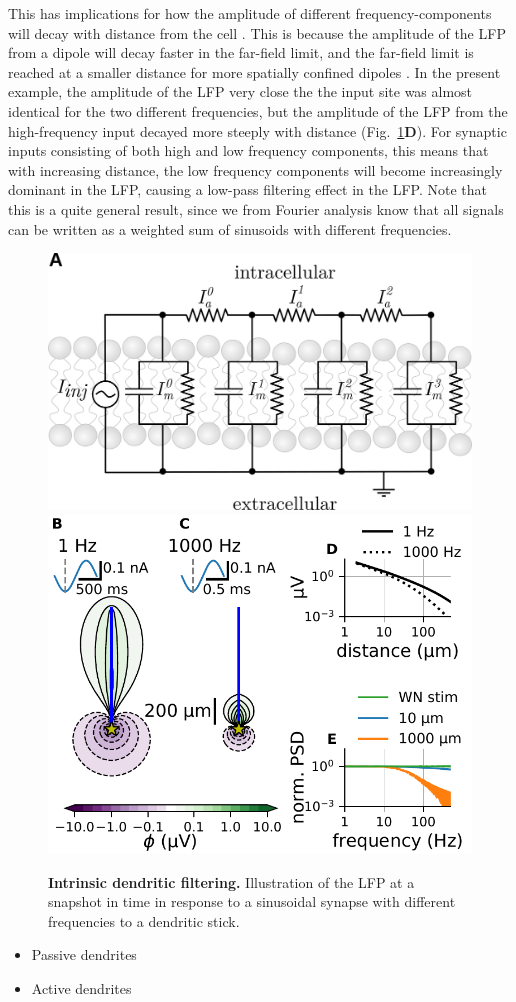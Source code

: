 This has implications for how the amplitude of different frequency-components will decay with distance from the cell \cite{Linden2010}. This is because the amplitude of the LFP from a dipole will decay faster in the far-field limit, and the far-field limit is reached at a smaller distance for more spatially confined dipoles \cite{Linden2010}. In the present example, the amplitude of the LFP very close the the input site was almost identical for the two different frequencies, but the amplitude of the LFP from the high-frequency input decayed more steeply with distance (Fig.~\ref{LFP:fig:intrinsic_dendritic_filt}{\bf D}). 
For synaptic inputs consisting of both high and low frequency 
components, this means that with increasing distance, the low frequency components will become increasingly dominant in the LFP, causing a low-pass filtering effect in the LFP.
Note that this is a quite general result, since we from Fourier analysis know that all signals can be written as a weighted sum of sinusoids with different frequencies.

\begin{figure}[!ht]
\begin{center}
\includegraphics[width=.4\textwidth]{Figures/LFP/cable_equiv_circuit.png}
\includegraphics[width=.4\textwidth]{Figures/LFP/intrinsic_dend_filt.pdf}
\end{center}
\caption{\textbf{Intrinsic dendritic filtering.}
Illustration of the LFP at a snapshot in time in response 
to a sinusoidal synapse with different frequencies to a 
dendritic stick.
}
\label{LFP:fig:intrinsic_dendritic_filt}
\end{figure}

\begin{itemize}
\item Passive dendrites \cite{Linden2010}
\item Active dendrites \cite{Ness2016}
\end{itemize}



